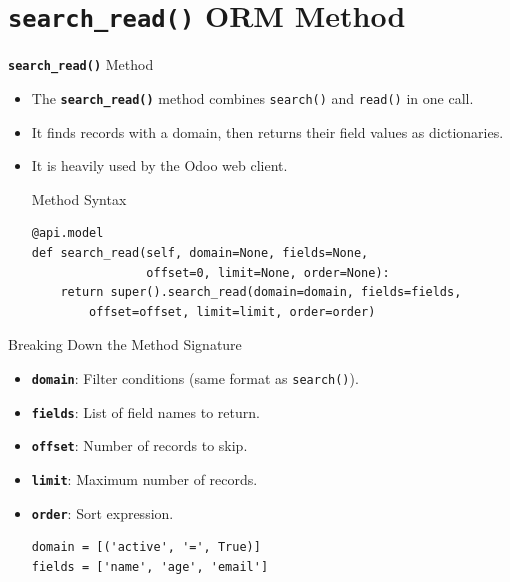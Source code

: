 
\section{\textbf{\texttt{search\_read()}} ORM Method}

\begin{frame}[fragile]{\textbf{\texttt{search\_read()}} Method}
	\begin{itemize}
		\item The \textbf{\texttt{search\_read()}} method combines \texttt{search()} and \texttt{read()} in one call.
		\item It finds records with a domain, then returns their field values as dictionaries.
		\item It is heavily used by the Odoo web client.
\begin{block}{Method Syntax}
\begin{lstlisting}
@api.model
def search_read(self, domain=None, fields=None,
				offset=0, limit=None, order=None):
	return super().search_read(domain=domain, fields=fields,
		offset=offset, limit=limit, order=order)
\end{lstlisting}
\end{block}
	\end{itemize}
\end{frame}

\begin{frame}[fragile]{Breaking Down the Method Signature}
	\begin{block}{}
		\begin{itemize}
			\item \textbf{\texttt{domain}}: Filter conditions (same format as \texttt{search()}).
			\item \textbf{\texttt{fields}}: List of field names to return.
			\item \textbf{\texttt{offset}}: Number of records to skip.
			\item \textbf{\texttt{limit}}: Maximum number of records.
			\item \textbf{\texttt{order}}: Sort expression.
\begin{lstlisting}
domain = [('active', '=', True)]
fields = ['name', 'age', 'email']
\end{lstlisting}
		\end{itemize}
	\end{block}
\end{frame}

